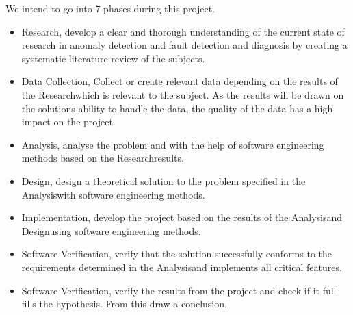 \documentclass[a4paper,8pt]{article}
\newcommand{\Phases}{7 }
\newcommand{\phaseq}{Research}
\newcommand{\phasew}{Data Collection}
\newcommand{\phasee}{Analysis}
\newcommand{\phaser}{Design}
\newcommand{\phaset}{Implementation}
\newcommand{\phasey}{Software Verification}
\begin{document}
	\newpage
	We intend to go into \Phases phases during this project.
		\begin{itemize}
			\item \phaseq, develop a clear and thorough understanding of the current state of research in anomaly detection and fault detection and diagnosis by creating a systematic literature review of the subjects.
			\item \phasew, Collect or create relevant data depending on the results of the \phaseq which is relevant to the subject. As the results will be drawn on the solutions ability to handle the data, the quality of the data has a high impact on the project.
			\item \phasee, analyse the problem and with the help of software engineering methods based on the \phaseq \space results.
			\item \phaser, design a theoretical solution to the problem specified in the \phasee with software engineering methods.
			\item \phaset, develop the project based on the results of the \phasee and \phaser using software engineering methods.
			\item \phasey, verify that the solution successfully conforms to the requirements determined in the \phasee and implements all critical features.
			\item \phasey, verify the results from the project and check if it full fills the hypothesis. From this draw a conclusion.
		\end{itemize}
	
\end{document}
